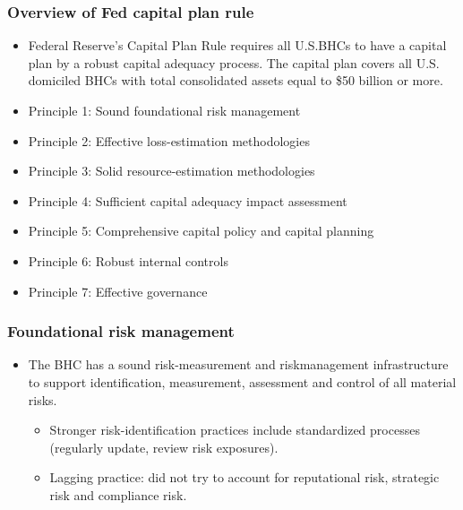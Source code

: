 \subsubsection{Overview of Fed capital plan rule}
\begin{itemize}
\item Federal Reserve's Capital Plan Rule requires all U.S.BHCs to have a capital plan by a robust capital adequacy process. The capital plan covers all U.S. domiciled BHCs with total consolidated assets equal to \$50 billion or more.
\item Principle 1: Sound foundational risk management
\item Principle 2: Effective loss-estimation methodologies
\item Principle 3: Solid resource-estimation methodologies
\item Principle 4: Sufficient capital adequacy impact assessment
\item Principle 5: Comprehensive capital policy and capital planning
\item Principle 6: Robust internal controls
\item Principle 7: Effective governance
\end{itemize}


\subsubsection{Foundational risk management}
\begin{itemize}
\item The BHC has a sound risk-measurement and riskmanagement infrastructure to support identification, measurement, assessment and control of all material risks.
    \begin{itemize}
    \item Stronger risk-identification practices include standardized processes (regularly update, review risk exposures).
    \item Lagging practice: did not try to account for reputational risk, strategic risk and compliance risk.
    \end{itemize}
\end{itemize}


